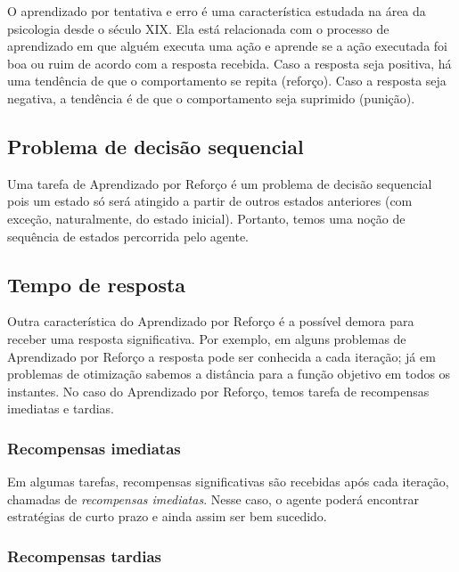 \documentclass{article}
\begin{document}
            O aprendizado por tentativa e erro é uma característica estudada na área da psicologia desde o século XIX. Ela está relacionada com o processo de aprendizado em que alguém executa uma ação e aprende se a ação executada foi boa ou ruim de acordo com a resposta recebida. Caso a resposta seja positiva, há uma tendência de que o comportamento se repita (reforço). Caso a resposta seja negativa, a tendência é de que o comportamento seja suprimido (punição).
        
        \subsection{Problema de decisão sequencial}
        
            Uma tarefa de Aprendizado por Reforço é um problema de decisão sequencial pois um estado só será atingido a partir de outros estados anteriores (com exceção, naturalmente, do estado inicial). Portanto, temos uma noção de sequência de estados percorrida pelo agente.
        
        
        \subsection{Tempo de resposta}
        
            Outra característica do Aprendizado por Reforço é a possível demora para receber uma resposta significativa. Por exemplo, em alguns problemas de Aprendizado por Reforço a resposta pode ser conhecida a cada iteração; já em problemas de otimização sabemos a distância para a função objetivo em todos os instantes. No caso do Aprendizado por Reforço, temos tarefa de recompensas imediatas e tardias.
        
            \subsubsection{Recompensas imediatas}
        
                Em algumas tarefas, recompensas significativas são recebidas após cada iteração, chamadas de \emph{recompensas imediatas}. Nesse caso, o agente poderá encontrar estratégias de curto prazo e ainda assim ser bem sucedido.
        
            \subsubsection{Recompensas tardias}
        
\end{document}
